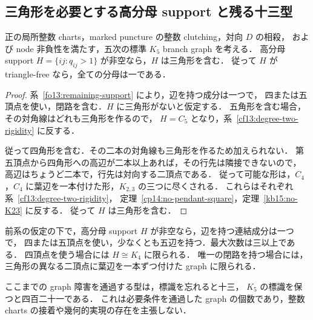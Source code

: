 \subsection{三角形を必要とする高分母 support と残る十三型}
\label{sf15:section}

\begin{corollary}[三角形の必要性]
\label{sf15:triangle-required}
正の局所整数 charts，marked puncture の整数 clutching，対向 $D$ の相殺，
および node 非負性を満たす，五次の標準 $K_5$ branch graph を考える．
高分母 support $H=\{ij:q_{ij}>1\}$ が非空なら，$H$ は三角形を含む．
従って $H$ が triangle-free なら，全ての分母は一である．
\end{corollary}

\begin{proof}
系~\ref{fo13:remaining-support} により，辺を持つ成分は一つで，
四または五頂点を使い，閉路を含む．$H$ に三角形がないと仮定する．
五角形を含む場合，その対角線はどれも三角形を作るので，
$H=C_5$ となり，系~\ref{cf13:degree-two-rigidity} に反する．

従って四角形を含む．その二本の対角線も三角形を作るため加えられない．
第五頂点から四角形への高辺が二本以上あれば，その行先は隣接できないので，
高辺はちょうど二本で，行先は対向する二頂点である．
従って可能な形は，$C_4$，$C_4$ に葉辺を一本付けた形，$K_{2,3}$ の三つに尽くされる．
これらはそれぞれ系~\ref{cf13:degree-two-rigidity}，
定理~\ref{cp14:no-pendant-square}，定理~\ref{kb15:no-K23} に反する．
従って $H$ は三角形を含む．
\end{proof}

\begin{corollary}
\label{sf15:remaining-support}
前系の仮定の下で，高分母 support $H$ が非空なら，辺を持つ連結成分は一つで，
四または五頂点を使い，少なくとも五辺を持つ．最大次数は三以上である．
四頂点を使う場合には $H\cong K_4$ に限られる．
唯一の閉路を持つ場合には，三角形の異なる二頂点に葉辺を一本ずつ付けた graph に限られる．

ここまでの graph 障害を通過する型は，標識を忘れると十三，
$K_5$ の標識を保つと四百二十一である．
これは必要条件を通過した graph の個数であり，整数 charts の接着や幾何的実現の存在を主張しない．
\end{corollary}

